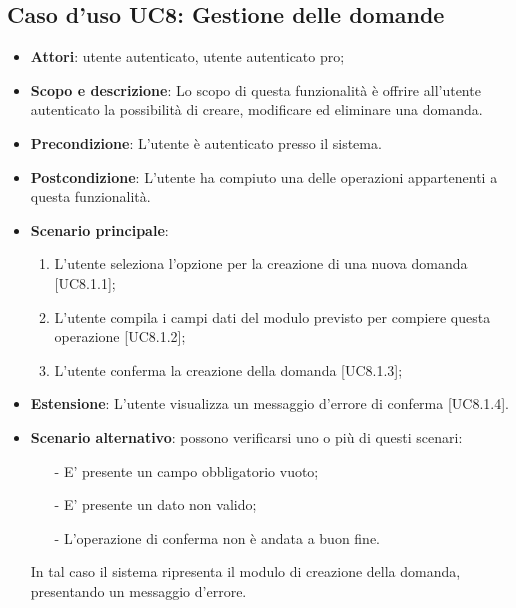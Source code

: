\subsection{Caso d'uso UC8: Gestione delle domande}
	\begin{itemize}
		\item
			\textbf{Attori}: utente autenticato, utente autenticato pro;
		\item		
			\textbf{Scopo e descrizione}: Lo scopo di questa funzionalità è offrire all'utente autenticato la possibilità di creare, modificare ed eliminare una domanda.
		\item
			\textbf{Precondizione}: L'utente è autenticato presso il sistema. 
		\item
			\textbf{	Postcondizione}: L'utente ha compiuto una delle operazioni appartenenti a questa funzionalità.		
		\item
			\textbf{Scenario principale}:
	       		\begin{enumerate}
					\item 	
					L'utente seleziona l'opzione per la creazione di una nuova domanda [UC8.1.1];
					\item
					L'utente compila i campi dati del modulo previsto per compiere questa operazione [UC8.1.2];
					\item
					L'utente conferma la creazione della domanda [UC8.1.3];
	 			\end{enumerate}
	 	\item
			\textbf{Estensione}: L'utente visualizza un messaggio d'errore di conferma [UC8.1.4].
	 	\item
	 		\textbf{Scenario alternativo}: possono verificarsi uno o più di questi scenari:
				\begin{itemize}
					\item[-] 	
						E' presente un campo obbligatorio vuoto;
					\item[-] 
    						E' presente un dato non valido;
					\item[-] 
						L'operazione di conferma non è andata a buon fine.
				\end{itemize}
			In tal caso il sistema ripresenta il modulo di creazione della domanda, presentando un messaggio d'errore.
	\end{itemize}
